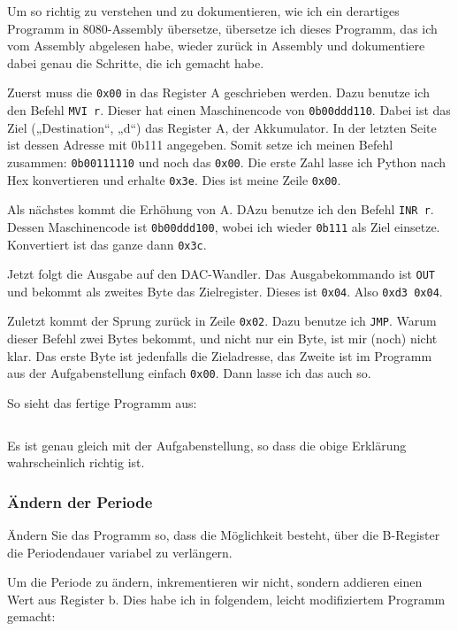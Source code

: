 Um so richtig zu verstehen und zu dokumentieren, wie ich ein derartiges
Programm in 8080-Assembly übersetze, übersetze ich dieses Programm, das ich vom
Assembly abgelesen habe, wieder zurück in Assembly und dokumentiere dabei genau
die Schritte, die ich gemacht habe.

Zuerst muss die \texttt{0x00} in das Register A geschrieben werden. Dazu
benutze ich den Befehl \texttt{MVI~r}. Dieser hat einen Maschinencode von
\texttt{0b00ddd110}. Dabei ist das Ziel („Destination“, „d“) das Register A, der
Akkumulator. In der letzten Seite ist dessen Adresse mit 0b111 angegeben. Somit
setze ich meinen Befehl zusammen: \texttt{0b00111110} und noch das \texttt{0x00}.
Die erste Zahl lasse ich Python nach Hex konvertieren und erhalte
\texttt{0x3e}. Dies ist meine Zeile \texttt{0x00}.

Als nächstes kommt die Erhöhung von A. DAzu benutze ich den Befehl
\texttt{INR~r}. Dessen Maschinencode ist \texttt{0b00ddd100}, wobei ich wieder
\texttt{0b111} als Ziel einsetze. Konvertiert ist das ganze dann \texttt{0x3c}.

Jetzt folgt die Ausgabe auf den DAC-Wandler. Das Ausgabekommando ist
\texttt{OUT} und bekommt als zweites Byte das Zielregister. Dieses ist
\texttt{0x04}. Also \texttt{0xd3~0x04}.

Zuletzt kommt der Sprung zurück in Zeile \texttt{0x02}. Dazu benutze ich
\texttt{JMP}. Warum dieser Befehl zwei Bytes bekommt, und nicht nur ein Byte,
ist mir (noch) nicht klar. Das erste Byte ist jedenfalls die Zieladresse, das
Zweite ist im Programm aus der Aufgabenstellung einfach \texttt{0x00}. Dann
lasse ich das auch so.

So sieht das fertige Programm aus:

\inputminted[fontsize=\small, linenos]{text}{../Assembly/a.s}

Es ist genau gleich mit der Aufgabenstellung, so dass die obige Erklärung
wahrscheinlich richtig ist.

\subsubsection{Ändern der Periode}

\begin{problem}
	Ändern Sie das Programm so, dass die Möglichkeit besteht, über die
	B-Register die Periodendauer variabel zu verlängern.
\end{problem}

Um die Periode zu ändern, inkrementieren wir nicht, sondern addieren einen Wert
aus Register b. Dies habe ich in folgendem, leicht modifiziertem Programm
gemacht:

